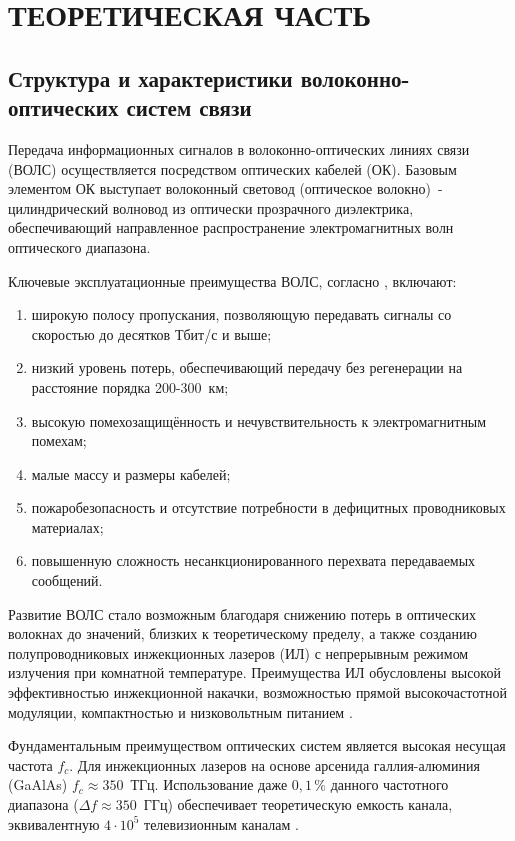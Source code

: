 \documentclass[14pt,a4paper]{extarticle}
\numberwithin{equation}{section}
\numberwithin{figure}{section}
\numberwithin{table}{section}
\begin{document}
 \newpage
\setcounter{section}{0}
\section{ТЕОРЕТИЧЕСКАЯ ЧАСТЬ}


\subsection{Структура и характеристики волоконно-оптических систем связи}

Передача информационных сигналов в волоконно-оптических линиях связи (ВОЛС) осуществляется посредством оптических кабелей (ОК). Базовым элементом ОК выступает волоконный световод (оптическое волокно)~- цилиндрический волновод из оптически прозрачного диэлектрика, обеспечивающий направленное распространение электромагнитных волн оптического диапазона.

Ключевые эксплуатационные преимущества ВОЛС, согласно \cite{Slepov,Burdin}, включают:
\begin{enumerate}
    \item широкую полосу пропускания, позволяющую передавать сигналы со скоростью до десятков Тбит/с и выше;
    \item низкий уровень потерь, обеспечивающий передачу без регенерации на расстояние порядка 200-300~км;
    \item высокую помехозащищённость и нечувствительность к электромагнитным помехам;
    \item малые массу и размеры кабелей;
    \item пожаробезопасность и отсутствие потребности в дефицитных проводниковых материалах;
    \item повышенную сложность несанкционированного перехвата передаваемых сообщений.
\end{enumerate}

Развитие ВОЛС стало возможным благодаря снижению потерь в оптических волокнах до значений, близких к теоретическому пределу, а также созданию полупроводниковых инжекционных лазеров (ИЛ) с непрерывным режимом излучения при комнатной температуре. Преимущества ИЛ обусловлены высокой эффективностью инжекционной накачки, возможностью прямой высокочастотной модуляции, компактностью и низковольтным питанием \cite{Slepov}.

Фундаментальным преимуществом оптических систем является высокая несущая частота $f_c$. Для инжекционных лазеров на основе арсенида галлия-алюминия (GaAlAs) $f_c \approx 350$~ТГц. Использование даже $0{,}1\,\%$ данного частотного диапазона ($\Delta f \approx 350$~ГГц) обеспечивает теоретическую емкость канала, эквивалентную $4 \cdot 10^5$ телевизионным каналам \cite{Slepov}.
\end{document}

